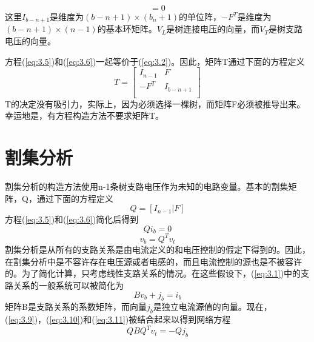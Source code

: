 \begin{equation}
    [I_{b-n+1}|-F^T][\frac{V_L}{V_T}]=0
    \label{eq:3.6}
\end{equation}
这里$I_{b-n+1}$是维度为$(b-n+1)\times(b_n+1)$的单位阵，$-F^T$是维度为$(b-n+1)\times(n-1)$的基本环矩阵。$V_L$是树连接电压的向量，而$V_T$是树支路电压的向量。

方程(\ref{eq:3.5})和(\ref{eq:3.6})一起等价于(\ref{eq:3.2})。因此，矩阵T通过下面的方程定义
\begin{equation}
    T=\begin{bmatrix}
I_{n-1} &F  \\
 -F^T& I_{b-n+1} \\
\end{bmatrix}
\label{eq:3.7}
\end{equation}
T的决定没有吸引力，实际上，因为必须选择一棵树，而矩阵F必须被推导出来。幸运地是，有方程构造方法不要求矩阵T。

\section{割集分析}
割集分析的构造方法使用n-1条树支路电压作为未知的电路变量。基本的割集矩阵，Q，通过下面的方程定义
\begin{equation}
    Q=[I_{n-1}|F]
    \label{eq:3.8}
\end{equation}
方程(\ref{eq:3.5})和(\ref{eq:3.6})简化后得到
\begin{equation}
    Qi_b=0
    \label{eq:3.9}
\end{equation}
\begin{equation}
    v_b = Q^Tv_t
    \label{eq:3.10}
\end{equation}
割集分析是从所有的支路关系是由电流定义的和电压控制的假定下得到的。因此，在割集分析中是不容许存在电压源或者电感的，而且电流控制的源也是不被容许的。为了简化计算，只考虑线性支路关系的情况。在这些假设下，(\ref{eq:3.1})中的支路关系的一般系统可以被简化为
\begin{equation}
    Bv_b +j_b = i_b
    \label{eq:3.11}
\end{equation}
矩阵B是支路关系的系数矩阵，而向量$j_b$是独立电流源值的向量。现在，(\ref{eq:3.9})，(\ref{eq:3.10})和(\ref{eq:3.11})被结合起来以得到网络方程
\begin{equation}
    QBQ^Tv_t = -Qj_b
    \label{eq:3.12}
\end{equation}

